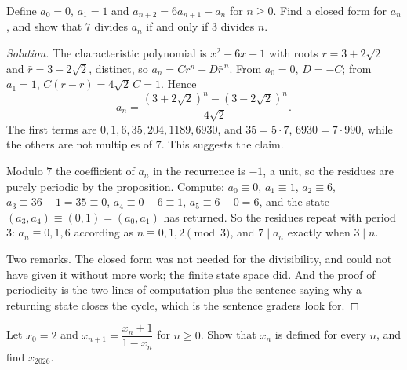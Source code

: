 \begin{example}
Define $a_0=0$, $a_1=1$ and $a_{n+2}=6a_{n+1}-a_n$ for $n\ge 0$. Find a closed form for $a_n$, and show that $7$ divides $a_n$ if and only if $3$ divides $n$.
\end{example}

\begin{proof}[Solution]
The characteristic polynomial is $x^2-6x+1$ with roots $r=3+2\sqrt2$ and $\bar r=3-2\sqrt2$, distinct, so $a_n=Cr^n+D\bar r^{\,n}$. From $a_0=0$, $D=-C$; from $a_1=1$, $C(r-\bar r)=4\sqrt2\,C=1$. Hence
\[
a_n=\frac{(3+2\sqrt2)^n-(3-2\sqrt2)^n}{4\sqrt2}.
\]
The first terms are $0,1,6,35,204,1189,6930$, and $35=5\cdot7$, $6930=7\cdot 990$, while the others are not multiples of $7$. This suggests the claim.

Modulo $7$ the coefficient of $a_n$ in the recurrence is $-1$, a unit, so the residues are purely periodic by the proposition. Compute: $a_0\equiv0$, $a_1\equiv1$, $a_2\equiv6$, $a_3\equiv 36-1=35\equiv0$, $a_4\equiv 0-6\equiv1$, $a_5\equiv 6-0=6$, and the state $(a_3,a_4)\equiv(0,1)=(a_0,a_1)$ has returned. So the residues repeat with period $3$: $a_n\equiv 0,1,6$ according as $n\equiv 0,1,2\pmod 3$, and $7\mid a_n$ exactly when $3\mid n$.

Two remarks. The closed form was not needed for the divisibility, and could not have given it without more work; the finite state space did. And the proof of periodicity is the two lines of computation plus the sentence saying why a returning state closes the cycle, which is the sentence graders look for.
\end{proof}

\begin{example}
Let $x_0=2$ and $x_{n+1}=\dfrac{x_n+1}{1-x_n}$ for $n\ge0$. Show that $x_n$ is defined for every $n$, and find $x_{2026}$.
\end{example}

